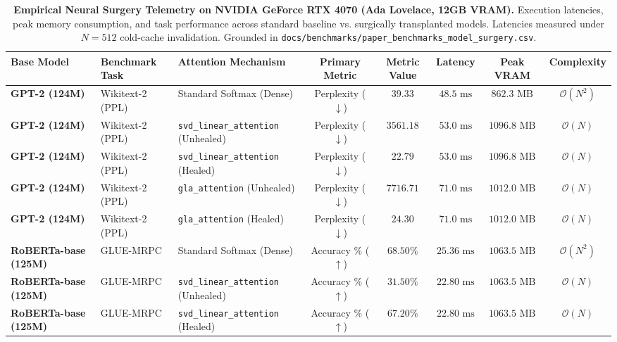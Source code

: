 \begin{table}[t]
\centering
\small
\caption[Empirical Neural Surgery Telemetry on NVIDIA GeForce RTX 4070]{\textbf{Empirical Neural Surgery Telemetry on NVIDIA GeForce RTX 4070 (Ada Lovelace, 12GB VRAM).} Execution latencies, peak memory consumption, and task performance across standard baseline vs. surgically transplanted models. Latencies measured under $N=512$ cold-cache invalidation. Grounded in \texttt{docs/benchmarks/paper\_benchmarks\_model\_surgery.csv}.}
\label{tab:paper_benchmarks_surgery_telemetry}
\setlength{\tabcolsep}{4.5pt}
\renewcommand{\arraystretch}{1.15}
\begin{tabularx}{\textwidth}{@{}l l l c c c c c@{}}
\toprule
\textbf{Base Model} & \textbf{Benchmark Task} & \textbf{Attention Mechanism} & \textbf{Primary Metric} & \textbf{Metric Value} & \textbf{Latency} & \textbf{Peak VRAM} & \textbf{Complexity} \\
\midrule
\textbf{GPT-2 (124M)} & Wikitext-2 (PPL) & Standard Softmax (Dense) & Perplexity ($\downarrow$) & $39.33$ & $48.5\text{ ms}$ & $862.3\text{ MB}$ & $\mathcal{O}(N^2)$ \\
\textbf{GPT-2 (124M)} & Wikitext-2 (PPL) & \texttt{svd\_linear\_attention} (Unhealed) & Perplexity ($\downarrow$) & $3561.18$ & $53.0\text{ ms}$ & $1096.8\text{ MB}$ & $\mathcal{O}(N)$ \\
\textbf{GPT-2 (124M)} & Wikitext-2 (PPL) & \texttt{svd\_linear\_attention} (Healed) & Perplexity ($\downarrow$) & $\mathbf{22.79}$ & $53.0\text{ ms}$ & $1096.8\text{ MB}$ & $\mathcal{O}(N)$ \\
\textbf{GPT-2 (124M)} & Wikitext-2 (PPL) & \texttt{gla\_attention} (Unhealed) & Perplexity ($\downarrow$) & $7716.71$ & $71.0\text{ ms}$ & $1012.0\text{ MB}$ & $\mathcal{O}(N)$ \\
\textbf{GPT-2 (124M)} & Wikitext-2 (PPL) & \texttt{gla\_attention} (Healed) & Perplexity ($\downarrow$) & $\mathbf{24.30}$ & $71.0\text{ ms}$ & $1012.0\text{ MB}$ & $\mathcal{O}(N)$ \\
\midrule
\textbf{RoBERTa-base (125M)} & GLUE-MRPC & Standard Softmax (Dense) & Accuracy \% ($\uparrow$) & $68.50\%$ & $25.36\text{ ms}$ & $1063.5\text{ MB}$ & $\mathcal{O}(N^2)$ \\
\textbf{RoBERTa-base (125M)} & GLUE-MRPC & \texttt{svd\_linear\_attention} (Unhealed) & Accuracy \% ($\uparrow$) & $31.50\%$ & $22.80\text{ ms}$ & $1063.5\text{ MB}$ & $\mathcal{O}(N)$ \\
\textbf{RoBERTa-base (125M)} & GLUE-MRPC & \texttt{svd\_linear\_attention} (Healed) & Accuracy \% ($\uparrow$) & $\mathbf{67.20\%}$ & $22.80\text{ ms}$ & $1063.5\text{ MB}$ & $\mathcal{O}(N)$ \\

\end{tabularx}
\end{table}
